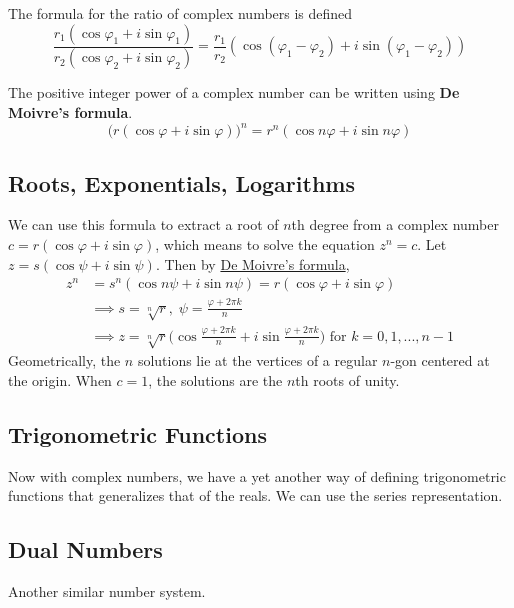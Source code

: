   \begin{corollary}
    \label{thm:ratio-of-complex-numbers-in-polar-form}
    The formula for the ratio of complex numbers is defined
    \begin{equation}
      \frac{r_1 (\cos{\varphi_1} + i \sin{\varphi_1})}{r_2 (\cos{\varphi_2} + i \sin{\varphi_2})} = \frac{r_1}{r_2} (\cos{(\varphi_1 - \varphi_2)} + i \sin{(\varphi_1 - \varphi_2)})
    \end{equation}
  \end{corollary}

  \begin{corollary}
    \label{thm:de-moivres-formula}
    The positive integer power of a complex number can be written using \textbf{De Moivre's formula}. 
    \begin{equation}
      \big(r(\cos{\varphi} + i \sin{\varphi})\big)^n = r^n (\cos{n \varphi} + i \sin{n \varphi})
    \end{equation}
  \end{corollary}

\subsection{Roots, Exponentials, Logarithms}

  We can use this formula to extract a root of $n$th degree from a complex number $c = r(\cos{\varphi} + i \sin{\varphi})$, which means to solve the equation $z^n = c$. Let $z = s (\cos{\psi} + i \sin{\psi})$. Then by \hyperref[thm:de-moivres-formula]{De Moivre's formula}, 
  \begin{align*}
    z^n & = s^n (\cos{n \psi} + i \sin{n \psi}) = r(\cos{\varphi} + i \sin{\varphi}) \\
    & \implies s = \sqrt[n]{r}, \; \psi = \frac{\varphi + 2\pi k}{n} \\
    & \implies z = \sqrt[n]{r} \bigg( \cos{\frac{\varphi + 2\pi k}{n}} + i \sin{\frac{\varphi + 2\pi k}{n}}\bigg) \text{ for } k = 0, 1, ..., n-1
  \end{align*}
  Geometrically, the $n$ solutions lie at the vertices of a regular $n$-gon centered at the origin. When $c = 1$, the solutions are the $n$th roots of unity.

\subsection{Trigonometric Functions}

  Now with complex numbers, we have a yet another way of defining trigonometric functions that generalizes that of the reals. We can use the series representation. 

\subsection{Dual Numbers}

  Another similar number system. 


